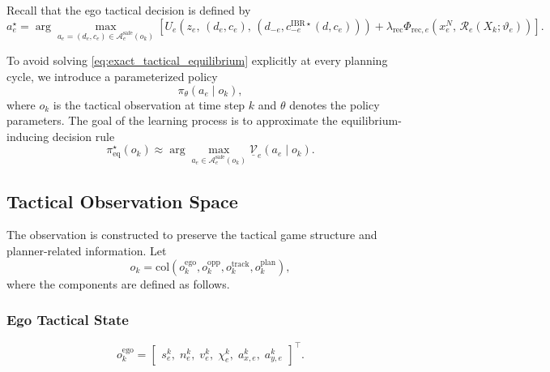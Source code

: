 \documentclass[final ,3p, times]{elsarticle}
\begin{document}
Recall that the ego tactical decision is defined by
\begin{equation}
a_e^\star
=
\arg\max_{a_e=(d_e,c_e)\in\mathcal{A}_e^{\mathrm{safe}}(o_k)}
\left[
U_e\!\left(
z_e,\,
(d_e,c_e),\,
(d_{-e},c_{-e}^{\mathrm{IBR}\star}(d,c_e))
\right)
+
\lambda_{\mathrm{rec}}
\Phi_{\mathrm{rec},e}
\left(
x_e^N,\,
\mathcal{R}_e(X_k;\vartheta_e)
\right)
\right].
\label{eq:exact_tactical_equilibrium}
\end{equation}

To avoid solving \eqref{eq:exact_tactical_equilibrium} explicitly at every planning cycle, we introduce a parameterized policy
\begin{equation}
\pi_\theta(a_e\mid o_k),
\label{eq:policy_def}
\end{equation}
where $o_k$ is the tactical observation at time step $k$ and $\theta$ denotes the policy parameters. The goal of the learning process is to approximate the equilibrium-inducing decision rule
\begin{equation}
\pi_{\mathrm{eq}}^\star(o_k)
\approx
\arg\max_{a_e\in\mathcal{A}_e^{\mathrm{safe}}(o_k)}
\underline{\mathcal{V}}_e(a_e\mid o_k).
\label{eq:equilibrium_policy_approx}
\end{equation}

\subsection{Tactical Observation Space}
\label{subsec:observation_space}

The observation is constructed to preserve the tactical game structure and planner-related information. Let
\begin{equation}
o_k =
\mathrm{col}
\left(
o_k^{\mathrm{ego}},
o_k^{\mathrm{opp}},
o_k^{\mathrm{track}},
o_k^{\mathrm{plan}}
\right),
\label{eq:observation_vector}
\end{equation}
where the components are defined as follows.

\subsubsection{Ego Tactical State}

\begin{equation}
o_k^{\mathrm{ego}}
=
\begin{bmatrix}
s_e^k,\;
n_e^k,\;
v_e^k,\;
\chi_e^k,\;
a_{x,e}^k,\;
a_{y,e}^k
\end{bmatrix}^{\!\top}.
\label{eq:ego_observation}
\end{equation}
\end{document}
